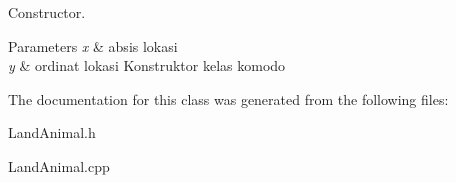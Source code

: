 Constructor. 


\begin{DoxyParams}{Parameters}
{\em x} & absis lokasi \\
\hline
{\em y} & ordinat lokasi Konstruktor kelas komodo \\
\hline
\end{DoxyParams}


The documentation for this class was generated from the following files\+:\begin{DoxyCompactItemize}
\item 
Land\+Animal.\+h\item 
Land\+Animal.\+cpp\end{DoxyCompactItemize}
